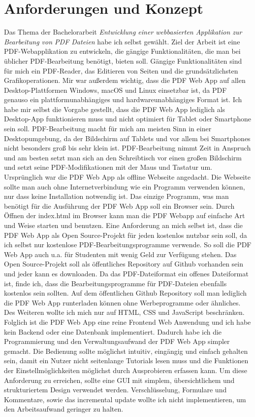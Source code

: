 \section{Anforderungen und Konzept}
Das Thema der Bachelorarbeit \textit{\glqq Entwicklung einer webbasierten Applikation zur Bearbeitung von PDF Dateien\grqq} habe ich selbst gewählt. Ziel der Arbeit ist eine PDF-Webapplikation zu entwickeln, die gängige Funktionalitäten, die man bei üblicher PDF-Bearbeitung benötigt, bieten soll. Gängige Funktionalitäten sind für mich ein PDF-Reader, das Editieren von Seiten und die grundsätzlichsten Grafikoperationen. Mir war außerdem wichtig, dass die PDF Web App auf allen Desktop-Plattformen Windows, macOS und Linux einsetzbar ist, da PDF genauso ein plattformunabhängiges und hardwareunabhängiges Format ist. Ich habe mir selbst die Vorgabe gestellt, dass die PDF Web App lediglich als Desktop-App funktionieren muss und nicht optimiert für Tablet oder Smartphone sein soll. PDF-Bearbeitung macht für mich am meisten Sinn in einer Desktopumgebung, da der Bildschirm auf Tablets und vor allem bei Smartphones nicht besonders groß bis sehr klein ist. PDF-Bearbeitung nimmt Zeit in Anspruch und am besten setzt man sich an den Schreibtisch vor einen großen Bildschirm und setzt seine PDF-Modifikationen mit der Maus und Tastatur um. \\
Ursprünglich war die PDF Web App als offline Webseite angedacht. Die Webseite sollte man auch ohne Internetverbindung wie ein Programm verwenden können, nur dass keine Installation notwendig ist. Das einzige Programm, was man benötigt für die Ausführung der PDF Web App soll ein Browser sein. Durch Öffnen der index.html im Browser kann man die PDF Webapp auf einfache Art und Weise starten und benutzen. Eine Anforderung an mich selbst ist, dass die PDF Web App als Open Source-Projekt für jeden kostenlos nutzbar sein soll, da ich selbst nur kostenlose PDF-Bearbeitungsprogramme verwende. So soll die PDF Web App auch u.a. für Studenten mit wenig Geld zur Verfügung stehen. Das Open Source-Projekt soll als öffentliches Repository auf Github vorhanden sein und jeder kann es downloaden. Da das PDF-Dateiformat ein offenes Dateiformat ist, finde ich, dass die Bearbeitungsprogramme für PDF-Dateien ebenfalls kostenlos sein sollten. Auf dem öffentlichen Github Repository soll man lediglich die PDF Web App runterladen können ohne Werbeprogramme oder ähnliches. \\
Des Weiteren wollte ich mich nur auf HTML, CSS und JavaScript beschränken. Folglich ist die PDF Web App eine reine Frontend Web Anwendung und ich habe kein Backend oder eine Datenbank implementiert. Dadurch habe ich die Programmierung und den Verwaltungsaufwand der PDF Web App simpler gemacht. Die Bedienung sollte möglichst intuitiv, eingängig und einfach gehalten sein, damit ein Nutzer nicht seitenlange Tutorials lesen muss und die Funktionen der Einstellmöglichkeiten möglichst durch Ausprobieren erfassen kann. Um diese Anforderung zu erreichen, sollte eine GUI mit simplem, übersichtlichem und strukturiertem Design verwendet werden. Verschlüsselung, Formulare und Kommentare, sowie das incremental update wollte ich nicht implementieren, um den Arbeitsaufwand geringer zu halten. \\
